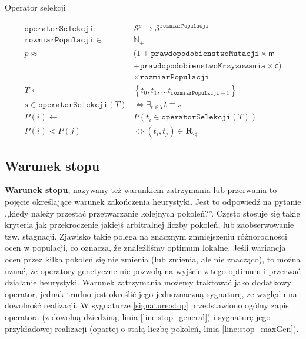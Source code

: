 \documentclass[twoside]{iisthesis}
\newcommand{\numberSet}[1]{\mathbb{#1}}
\newcommand{\important}[1]{\mathcal{#1}}
\newcommand{\R}{\mathbf{R}}
\newcommand{\minoritySpecimenRel}{{\R}_{\lhd}}
\newcommand{\param}[1]{\mathtt{#1}}
\newcommand{\variable}[1]{\mathsf{#1}}
\newcommand{\outputVar}[1]{\variable{\underline{#1}}}
\begin{document}
\begin{signature}
	\caption{Operator selekcji \label{signature:selection}}
	\begin{align}
	\param{operatorSelekcji}: &\important{S}^p \rightarrow \important{S}^{\param{rozmiarPopulacji}} \\
	\param{rozmiarPopulacji} \in &\numberSet{N}_{+} \\
	\label{line:p_start} 
	p \approx &(1 + \param{prawdopodobienstwoMutacji} \times \variable{m} \\
	          &+ \param{prawdopodobienstwoKrzyzowania} \times \outputVar{c}) \\
	\label{line:p_stop} 
	&\times \param{rozmiarPopulacji} \\
	\label{line:constraint_sel_start}          
	T \gets &\left\{ t_0, t_1, \ldots t_{\param{rozmiarPopulacji}-1} \right\} \\
	s \in \param{operatorSelekcji}(T) &\Leftrightarrow \exists_{t \in T}  t \equiv s \\
	P(i) \gets &P(t_i \in \param{operatorSelekcji}(T)) \\
	\label{line:constraint_sel_stop} 
	P(i) < P(j) &\Leftrightarrow (t_i, t_j) \in \minoritySpecimenRel
	\end{align}
\end{signature}

\subsection{Warunek stopu} \label{subsection:stop}

\textbf{Warunek stopu}, nazywany też warunkiem zatrzymania lub przerwania to pojęcie określające warunek zakończenia heurystyki. Jest to odpowiedź na pytanie ,,kiedy należy przestać przetwarzanie kolejnych pokoleń?''. Często stosuje się takie kryteria jak przekroczenie jakiejś arbitralnej liczby pokoleń, lub zaobserwowanie tzw. stagnacji. Zjawisko takie polega na znacznym zmniejszeniu różnorodności ocen w populacji, co oznacza, że znaleźliśmy optimum lokalne. Jeśli wariancja ocen przez kilka pokoleń się nie zmienia (lub zmienia, ale nie znacząco), to można uznać, że operatory genetyczne nie pozwolą na wyjście z tego optimum i przerwać działanie heurystyki. 
Warunek zatrzymania możemy traktować jako dodatkowy operator, jednak trudno jest określić jego jednoznaczną sygnaturę, ze względu na dowolność realizacji. W sygnaturze \ref{signature:stop} przedstawiono ogólny zapis operatora (z dowolną dziedziną, linia \ref{line:stop_general}) i sygnaturę jego przykładowej realizacji (opartej o stałą liczbę pokoleń, linia \ref{line:stop_maxGen}).
\end{document}
